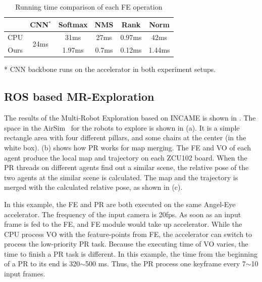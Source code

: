 \begin{table}[t]
 \centering
 \caption{Running time comparison of each FE operation}
 \begin{threeparttable}
\begin{tabular}{|c|c|c|c|c|c|}
 \hline
  &CNN$^*$ & Softmax & NMS & Rank & Norm \\
 \hline
  CPU & \multirow{2}{*}{24ms} & 31ms & 27ms & 0.97ms & 42ms \\
 \cline{1-1} \cline{3-6}
 Ours & \multirow{2}{*}{} & 1.97ms & 0.7ms & 0.12ms & 1.44ms \\
 \hline
 \end{tabular} 
 
\begin{tablenotes}
 \footnotesize
 \item[*] CNN backbone runs on the accelerator in both experiment setups. 
\end{tablenotes}
 \end{threeparttable}
 
 \label{tab:optimization}%
\end{table}%


\subsection{ ROS based MR-Exploration }

The results of the Multi-Robot Exploration based on INCAME is shown in . The space in the AirSim~\cite{shah2018airsim} for the robots to explore is shown in (a). It is a simple rectangle area with four different pillars, and some chairs at the center (in the white box). (b) shows how PR works for map merging. The FE and VO of each agent produce the local map and trajectory on each ZCU102 board. When the PR threads on different agents find out a similar scene, the relative pose of the two agents at the similar scene is calculated. The map and the trajectory is merged with the calculated relative pose, as shown in (c).

In this example, the FE and PR are both executed on the same Angel-Eye accelerator. The frequency of the input camera is 20fps. As soon as an input frame is fed to the FE, and FE module would take up accelerator. While the CPU process VO with the feature-points from FE, the accelerator can switch to process the low-priority PR task. Because the executing time of VO varies, the time to finish a PR task is different. In this example, the time from the beginning of a PR to its end is 320$\sim$500 ms. Thus, the PR process one keyframe every 7$\sim$10 input frames.